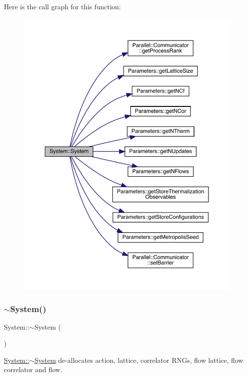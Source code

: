 Here is the call graph for this function\+:
\nopagebreak
\begin{figure}[H]
\begin{center}
\leavevmode
\includegraphics[width=350pt]{class_system_ae317936c9bcf1374d61745572e0f2f8a_cgraph}
\end{center}
\end{figure}
\mbox{\label{class_system_a3be70bb338e3f062f821173fd15680d0}} 
\subsubsection{\texorpdfstring{$\sim$System()}{~System()}}
{\footnotesize\ttfamily System\+::$\sim$\+System (\begin{DoxyParamCaption}{ }\end{DoxyParamCaption})}



\mbox{\hyperlink{class_system_a3be70bb338e3f062f821173fd15680d0}{System\+::$\sim$\+System}} de-\/allocates action, lattice, correlator R\+N\+Gs, flow lattice, flow correlator and flow. 



